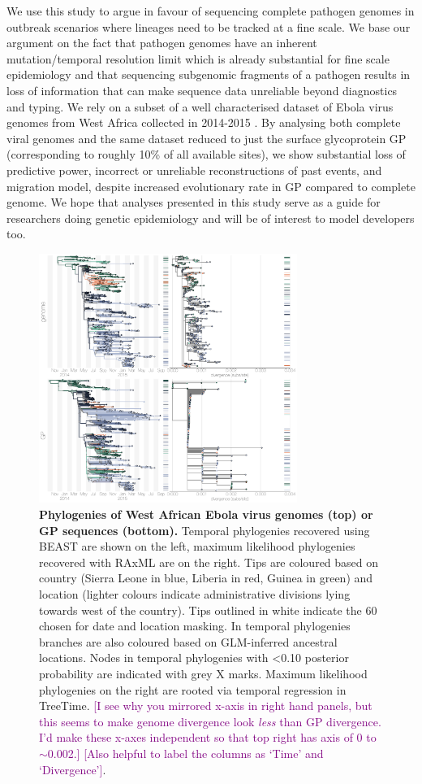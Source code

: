 \documentclass[11pt,oneside,letterpaper]{article}
\def\tbc#1{\textcolor{purple}{[#1]}}
\begin{document}
We use this study to argue in favour of sequencing complete pathogen genomes in outbreak scenarios where lineages need to be tracked at a fine scale.
We base our argument on the fact that pathogen genomes have an inherent mutation/temporal resolution limit which is already substantial for fine scale epidemiology and that sequencing subgenomic fragments of a pathogen results in loss of information that can make sequence data unreliable beyond diagnostics and typing.
We rely on a subset of a well characterised dataset of Ebola virus genomes from West Africa collected in 2014-2015 \citep{dudas_virus_2017}.
By analysing both complete viral genomes and the same dataset reduced to just the surface glycoprotein GP (corresponding to roughly 10\% of all available sites), we show substantial loss of predictive power, incorrect or unreliable reconstructions of past events, and migration model, despite increased evolutionary rate in GP compared to complete genome.
We hope that analyses presented in this study serve as a guide for researchers doing genetic epidemiology and will be of interest to model developers too.

\begin{figure}[h]
 \centering
	\includegraphics[width=0.75\textwidth]{figures/fig1_trees.png}
	\caption{\textbf{Phylogenies of West African Ebola virus genomes (top) or GP sequences (bottom).}
	Temporal phylogenies recovered using BEAST are shown on the left, maximum likelihood phylogenies recovered with RAxML are on the right.
  Tips are coloured based on country (Sierra Leone in blue, Liberia in red, Guinea in green) and location (lighter colours indicate administrative divisions lying towards west of the country).
  Tips outlined in white indicate the 60 chosen for date and location masking.
  In temporal phylogenies branches are also coloured based on GLM-inferred ancestral locations.
  Nodes in temporal phylogenies with <0.10 posterior probability are indicated with grey X marks.
  Maximum likelihood phylogenies on the right are rooted via temporal regression in TreeTime.
  \tbc{I see why you mirrored x-axis in right hand panels, but this seems to make genome divergence look \textit{less} than GP divergence. I'd make these x-axes independent so that top right has axis of 0 to $\sim$0.002.}
  \tbc{Also helpful to label the columns as `Time' and `Divergence'}.
	}
	\label{trees}
\end{figure}
\end{document}
